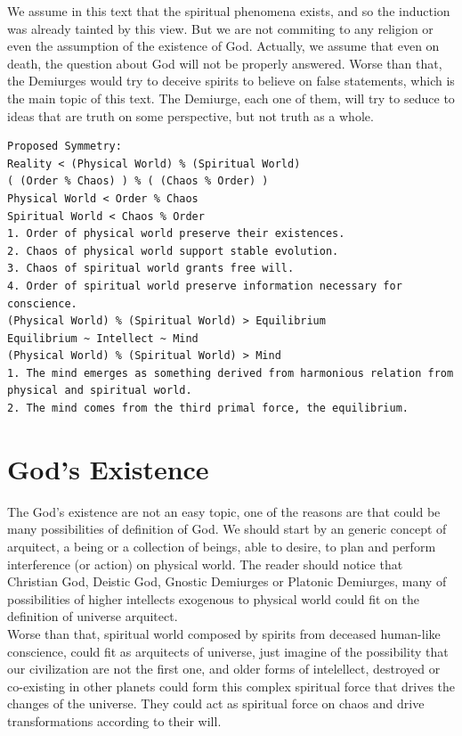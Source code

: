 \documentclass[12pt,a4paper]{article}
\begin{document}
We assume in this text that the spiritual phenomena exists, and so the induction was already tainted by this view. But we are not commiting to any religion or even the assumption of the existence of God. Actually, we assume that even on death, the question about God will not be properly answered. Worse than that, the Demiurges would try to deceive spirits to believe on false statements, which is the main topic of this text. The Demiurge, each one of them, will try to seduce to ideas that are truth on some perspective, but not truth as a whole.\\

\begin{lstlisting}
Proposed Symmetry:
Reality < (Physical World) % (Spiritual World)
( (Order % Chaos) ) % ( (Chaos % Order) )
Physical World < Order % Chaos
Spiritual World < Chaos % Order
1. Order of physical world preserve their existences. 
2. Chaos of physical world support stable evolution.
3. Chaos of spiritual world grants free will.
4. Order of spiritual world preserve information necessary for conscience.
(Physical World) % (Spiritual World) > Equilibrium
Equilibrium ~ Intellect ~ Mind 
(Physical World) % (Spiritual World) > Mind 
1. The mind emerges as something derived from harmonious relation from physical and spiritual world.
2. The mind comes from the third primal force, the equilibrium.
\end{lstlisting}

\section{God's Existence}

\hspace{\baselineskip}

The God's existence are not an easy topic, one of the reasons are that could be many possibilities of definition of God. We should start by an generic concept of arquitect, a being or a collection of beings, able to desire, to plan and perform interference (or action) on physical world. The reader should notice that Christian God, Deistic God, Gnostic Demiurges or Platonic Demiurges, many of possibilities of higher intellects exogenous to physical world could fit on the definition of universe arquitect. \\

Worse than that, spiritual world composed by spirits from deceased human-like conscience, could fit as arquitects of universe, just imagine of the possibility that our civilization are not the first one, and older forms of intelellect, destroyed or co-existing in other planets could form this complex spiritual force that drives the changes of the universe. They could act as spiritual force on chaos and drive transformations according to their will.\\
\end{document}
